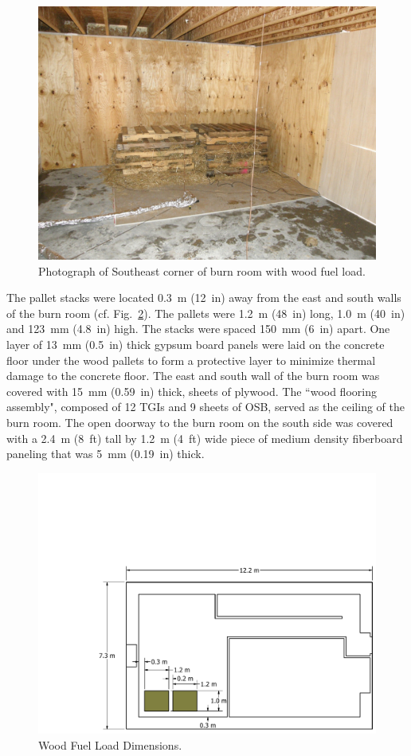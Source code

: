 \documentclass[12pt,oneside]{book}
\begin{document}
\begin{figure}[!ht]
	\includegraphics[width=0.65\columnwidth]{../Figures/Pictures/Wood_Fuel_Package}
	\caption{Photograph of Southeast corner of burn room with wood fuel load.}
	\label{fig:Wood_Fuel_Load}
\end{figure}

The pallet stacks were located 0.3~m (12~in) away from the east and south walls of the burn room (cf. Fig.~\ref{fig:Wood_Fuel_Load_Dimensions}). The pallets were 1.2~m (48~in) long, 1.0~m (40~in) and 123~mm (4.8~in) high. The stacks were spaced 150~mm (6~in) apart. One layer of 13~mm (0.5~in) thick gypsum board panels were laid on the concrete floor under the wood pallets to form a protective layer to minimize thermal damage to the concrete floor. The east and south wall of the burn room was covered with 15~mm (0.59~in) thick, sheets of plywood.  The ``wood flooring assembly", composed of 12 TGIs and 9 sheets of OSB, served as the ceiling of the burn room. The open doorway to the burn room on the south side was covered with a 2.4~m (8~ft) tall by 1.2~m (4~ft) wide piece of medium density fiberboard paneling that was 5~mm (0.19~in) thick.

\begin{figure}[!ht]
	\includegraphics[width=.8\columnwidth]{../Figures/Floor_Plans/PDFs/East_Structure/DelCo_2012_East_Structure_Pallets}
	\caption{Wood Fuel Load Dimensions.}
	\label{fig:Wood_Fuel_Load_Dimensions}
\end{figure}
\end{document}
